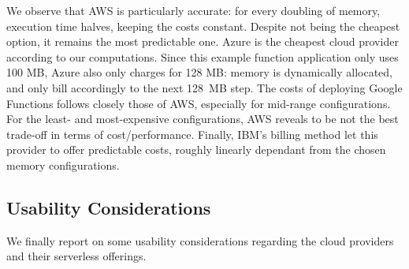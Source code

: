 We observe that \gls{AWS} is particularly accurate: for every doubling of memory, execution time halves, keeping the costs constant.
Despite not being the cheapest option, it remains the most predictable one. 
Azure is the cheapest cloud provider according to our computations.
Since this example function application only uses 100 \gls{MB}, Azure also only charges for 128 \gls{MB}: memory is dynamically allocated, and only bill accordingly to the next 128~MB step.
The costs of deploying Google Functions follows closely those of \gls{AWS}, especially for mid-range configurations.
For the least- and most-expensive configurations, AWS reveals to be not the best trade-off in terms of cost/performance.
Finally, IBM's billing method let this provider to offer predictable costs, roughly linearly dependant from the chosen memory configurations.

\subsection{Usability Considerations}
We finally report on some usability considerations regarding the cloud providers and their serverless offerings.


